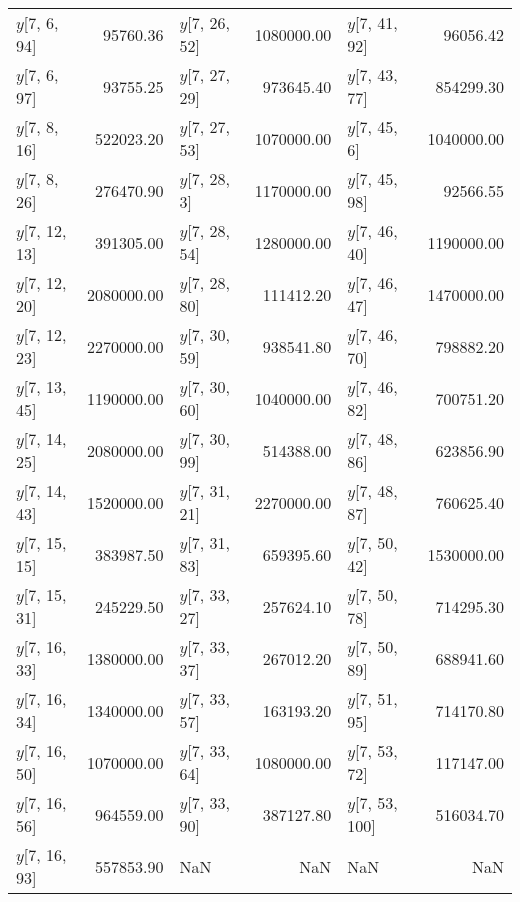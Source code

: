 \begin{longtable}{lrlrlr}
$y$[7, 6, 94] & 95760.36 & $y$[7, 26, 52] & 1080000.00 & $y$[7, 41, 92] & 96056.42 \\
$y$[7, 6, 97] & 93755.25 & $y$[7, 27, 29] & 973645.40 & $y$[7, 43, 77] & 854299.30 \\
$y$[7, 8, 16] & 522023.20 & $y$[7, 27, 53] & 1070000.00 & $y$[7, 45, 6] & 1040000.00 \\
$y$[7, 8, 26] & 276470.90 & $y$[7, 28, 3] & 1170000.00 & $y$[7, 45, 98] & 92566.55 \\
$y$[7, 12, 13] & 391305.00 & $y$[7, 28, 54] & 1280000.00 & $y$[7, 46, 40] & 1190000.00 \\
$y$[7, 12, 20] & 2080000.00 & $y$[7, 28, 80] & 111412.20 & $y$[7, 46, 47] & 1470000.00 \\
$y$[7, 12, 23] & 2270000.00 & $y$[7, 30, 59] & 938541.80 & $y$[7, 46, 70] & 798882.20 \\
$y$[7, 13, 45] & 1190000.00 & $y$[7, 30, 60] & 1040000.00 & $y$[7, 46, 82] & 700751.20 \\
$y$[7, 14, 25] & 2080000.00 & $y$[7, 30, 99] & 514388.00 & $y$[7, 48, 86] & 623856.90 \\
$y$[7, 14, 43] & 1520000.00 & $y$[7, 31, 21] & 2270000.00 & $y$[7, 48, 87] & 760625.40 \\
$y$[7, 15, 15] & 383987.50 & $y$[7, 31, 83] & 659395.60 & $y$[7, 50, 42] & 1530000.00 \\
$y$[7, 15, 31] & 245229.50 & $y$[7, 33, 27] & 257624.10 & $y$[7, 50, 78] & 714295.30 \\
$y$[7, 16, 33] & 1380000.00 & $y$[7, 33, 37] & 267012.20 & $y$[7, 50, 89] & 688941.60 \\
$y$[7, 16, 34] & 1340000.00 & $y$[7, 33, 57] & 163193.20 & $y$[7, 51, 95] & 714170.80 \\
$y$[7, 16, 50] & 1070000.00 & $y$[7, 33, 64] & 1080000.00 & $y$[7, 53, 72] & 117147.00 \\
$y$[7, 16, 56] & 964559.00 & $y$[7, 33, 90] & 387127.80 & $y$[7, 53, 100] & 516034.70 \\
$y$[7, 16, 93] & 557853.90 & NaN & NaN & NaN & NaN \\
\end{longtable}
